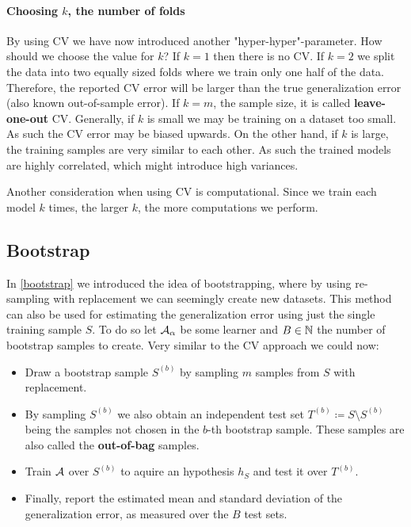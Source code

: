 \paragraph{Choosing $k$, the number of folds} By using CV we have now introduced another "hyper-hyper"-parameter. How should we choose the value for $k$? If $k=1$ then there is no CV. If $k=2$ we split the data into two equally sized folds where we train only one half of the data. Therefore, the reported CV error will be larger than the true generalization error (also known out-of-sample error). If $k=m$, the sample size, it is called \textbf{leave-one-out} CV. Generally, if $k$ is small we may be training on a dataset too small. As such the CV error may be biased upwards. On the other hand, if $k$ is large, the training samples are very similar to each other. As such the trained models are highly correlated, which might introduce high variances.

\begin{remark}
Another consideration when using CV is computational. Since we train each model $k$ times, the larger $k$, the more computations we perform.
\end{remark}

\subsection{Bootstrap}
In \autoref{bootstrap} we introduced the idea of bootstrapping, where by using re-sampling with replacement we can seemingly create new datasets. This method can also be used for estimating the generalization error using just the single training sample $S$. To do so let $\mathcal{A}_\alpha$ be some learner and $B\in\mathbb{N}$ the number of bootstrap samples to create. Very similar to the CV approach we could now:
\begin{itemize}
	\item Draw a bootstrap sample $S^{\left(b\right)}$ by sampling $m$ samples from $S$ with replacement.
	\item By sampling $S^{\left(b\right)}$ we also obtain an independent test set $T^{\left(b\right)}\coloneqq S\setminus S^{\left(b\right)}$ being the samples not chosen in the $b$-th bootstrap sample. These samples are also called the \textbf{out-of-bag} samples.
	\item Train $\mathcal{A}$ over $S^{\left(b\right)}$ to aquire an hypothesis $h_S$ and test it over $T^{\left(b\right)}$.
	\item Finally, report the estimated mean and standard deviation of the generalization error, as measured over the $B$ test sets.
\end{itemize} 
